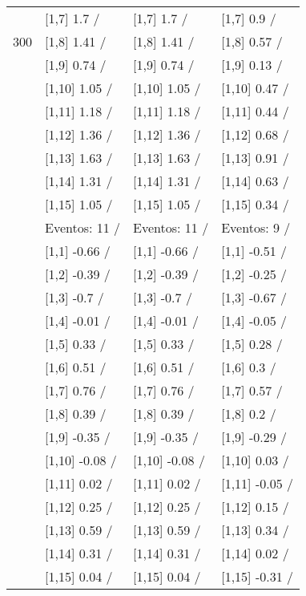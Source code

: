 \begin{table}
\begin{tabular}[t]{llll}
 & {}[1,7] 1.7  / & {}[1,7] 1.7  / & {}[1,7] 0.9  /\\
300 & {}[1,8] 1.41  / & {}[1,8] 1.41  / & {}[1,8] 0.57  /\\
\addlinespace
 & {}[1,9] 0.74  / & {}[1,9] 0.74  / & {}[1,9] 0.13  /\\
 & {}[1,10] 1.05  / & {}[1,10] 1.05  / & {}[1,10] 0.47  /\\
 & {}[1,11] 1.18  / & {}[1,11] 1.18  / & {}[1,11] 0.44  /\\
 & {}[1,12] 1.36  / & {}[1,12] 1.36  / & {}[1,12] 0.68  /\\
 & {}[1,13] 1.63  / & {}[1,13] 1.63  / & {}[1,13] 0.91  /\\
\addlinespace
 & {}[1,14] 1.31  / & {}[1,14] 1.31  / & {}[1,14] 0.63  /\\
 & {}[1,15] 1.05  / & {}[1,15] 1.05  / & {}[1,15] 0.34  /\\
 & Eventos:  11 / & Eventos:  11 / & Eventos:  9 /\\
 & {}[1,1] -0.66  / & {}[1,1] -0.66  / & {}[1,1] -0.51  /\\
 & {}[1,2] -0.39  / & {}[1,2] -0.39  / & {}[1,2] -0.25  /\\
\addlinespace
 & {}[1,3] -0.7  / & {}[1,3] -0.7  / & {}[1,3] -0.67  /\\
 & {}[1,4] -0.01  / & {}[1,4] -0.01  / & {}[1,4] -0.05  /\\
 & {}[1,5] 0.33  / & {}[1,5] 0.33  / & {}[1,5] 0.28  /\\
 & {}[1,6] 0.51  / & {}[1,6] 0.51  / & {}[1,6] 0.3  /\\
 & {}[1,7] 0.76  / & {}[1,7] 0.76  / & {}[1,7] 0.57  /\\
\addlinespace
500 & {}[1,8] 0.39  / & {}[1,8] 0.39  / & {}[1,8] 0.2  /\\
 & {}[1,9] -0.35  / & {}[1,9] -0.35  / & {}[1,9] -0.29  /\\
 & {}[1,10] -0.08  / & {}[1,10] -0.08  / & {}[1,10] 0.03  /\\
 & {}[1,11] 0.02  / & {}[1,11] 0.02  / & {}[1,11] -0.05  /\\
 & {}[1,12] 0.25  / & {}[1,12] 0.25  / & {}[1,12] 0.15  /\\
\addlinespace
 & {}[1,13] 0.59  / & {}[1,13] 0.59  / & {}[1,13] 0.34  /\\
 & {}[1,14] 0.31  / & {}[1,14] 0.31  / & {}[1,14] 0.02  /\\
 & {}[1,15] 0.04  / & {}[1,15] 0.04  / & {}[1,15] -0.31  /\\
\bottomrule
\end{tabular}
\end{table}
